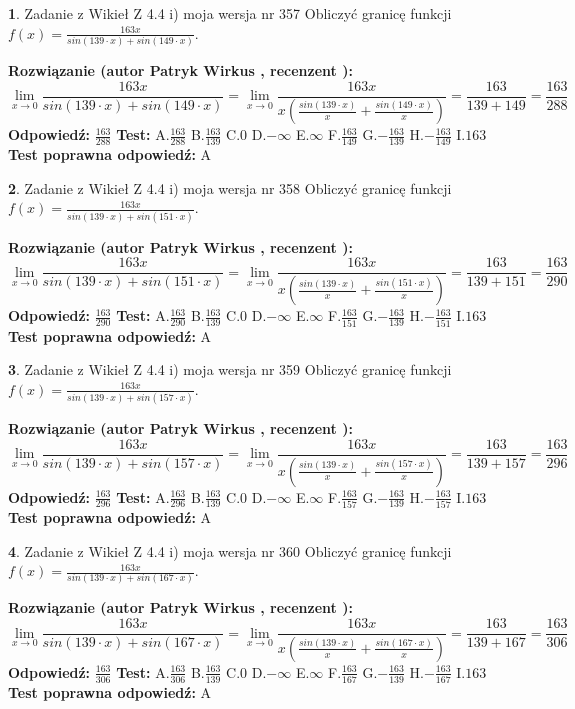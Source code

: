 \documentclass[12pt, a4paper]{article}
\theoremstyle{definition} %
\newtheorem{zad}{}
\newcommand{\zadStart}[1]{\begin{zad}#1\newline}
\newcommand{\zadStop}{\end{zad}}
\newcommand{\rozwStart}[2]{\noindent \textbf{Rozwiązanie (autor #1 , recenzent #2): }\newline}
\newcommand{\rozwStop}{\newline}
\newcommand{\odpStart}{\noindent \textbf{Odpowiedź:}\newline}
\newcommand{\odpStop}{\newline}
\newcommand{\testStart}{\noindent \textbf{Test:}\newline}
\newcommand{\testStop}{\newline}
\newcommand{\kluczStart}{\noindent \textbf{Test poprawna odpowiedź:}\newline}
\newcommand{\kluczStop}{\newline}
\begin{document}
\zadStart{Zadanie z Wikieł Z 4.4 i) moja wersja nr 357}
Obliczyć granicę funkcji $f(x)=\frac{163x}{sin(139\cdot x) +sin(149\cdot x)}$.
\zadStop
\rozwStart{Patryk Wirkus}{}
$$\lim\limits_{x\to 0}\frac{163x}{sin(139\cdot x) +sin(149\cdot x)}=\lim\limits_{x\to 0}\frac{163x}{x(\frac{sin(139\cdot x)}{x}+\frac{sin(149\cdot x)}{x})}=\frac{163}{139+149} = \frac{163}{288}$$
\rozwStop
\odpStart
$\frac{163}{288}$
\odpStop
\testStart
A.$\frac{163}{288}$
B.$\frac{163}{139}$
C.$0$
D.$-\infty$
E.$\infty$
F.$\frac{163}{149}$
G.$-\frac{163}{139}$
H.$-\frac{163}{149}$
I.$163$
\testStop
\kluczStart
A
\kluczStop



\zadStart{Zadanie z Wikieł Z 4.4 i) moja wersja nr 358}
Obliczyć granicę funkcji $f(x)=\frac{163x}{sin(139\cdot x) +sin(151\cdot x)}$.
\zadStop
\rozwStart{Patryk Wirkus}{}
$$\lim\limits_{x\to 0}\frac{163x}{sin(139\cdot x) +sin(151\cdot x)}=\lim\limits_{x\to 0}\frac{163x}{x(\frac{sin(139\cdot x)}{x}+\frac{sin(151\cdot x)}{x})}=\frac{163}{139+151} = \frac{163}{290}$$
\rozwStop
\odpStart
$\frac{163}{290}$
\odpStop
\testStart
A.$\frac{163}{290}$
B.$\frac{163}{139}$
C.$0$
D.$-\infty$
E.$\infty$
F.$\frac{163}{151}$
G.$-\frac{163}{139}$
H.$-\frac{163}{151}$
I.$163$
\testStop
\kluczStart
A
\kluczStop



\zadStart{Zadanie z Wikieł Z 4.4 i) moja wersja nr 359}
Obliczyć granicę funkcji $f(x)=\frac{163x}{sin(139\cdot x) +sin(157\cdot x)}$.
\zadStop
\rozwStart{Patryk Wirkus}{}
$$\lim\limits_{x\to 0}\frac{163x}{sin(139\cdot x) +sin(157\cdot x)}=\lim\limits_{x\to 0}\frac{163x}{x(\frac{sin(139\cdot x)}{x}+\frac{sin(157\cdot x)}{x})}=\frac{163}{139+157} = \frac{163}{296}$$
\rozwStop
\odpStart
$\frac{163}{296}$
\odpStop
\testStart
A.$\frac{163}{296}$
B.$\frac{163}{139}$
C.$0$
D.$-\infty$
E.$\infty$
F.$\frac{163}{157}$
G.$-\frac{163}{139}$
H.$-\frac{163}{157}$
I.$163$
\testStop
\kluczStart
A
\kluczStop



\zadStart{Zadanie z Wikieł Z 4.4 i) moja wersja nr 360}
Obliczyć granicę funkcji $f(x)=\frac{163x}{sin(139\cdot x) +sin(167\cdot x)}$.
\zadStop
\rozwStart{Patryk Wirkus}{}
$$\lim\limits_{x\to 0}\frac{163x}{sin(139\cdot x) +sin(167\cdot x)}=\lim\limits_{x\to 0}\frac{163x}{x(\frac{sin(139\cdot x)}{x}+\frac{sin(167\cdot x)}{x})}=\frac{163}{139+167} = \frac{163}{306}$$
\rozwStop
\odpStart
$\frac{163}{306}$
\odpStop
\testStart
A.$\frac{163}{306}$
B.$\frac{163}{139}$
C.$0$
D.$-\infty$
E.$\infty$
F.$\frac{163}{167}$
G.$-\frac{163}{139}$
H.$-\frac{163}{167}$
I.$163$
\testStop
\kluczStart
A
\kluczStop
\end{document}
